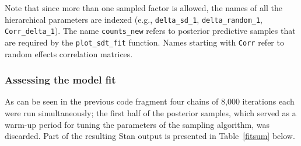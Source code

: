 \documentclass[a4paper,man,apacite,floatsintext]{apa6}
\newcommand{\code}[1]{\texttt{#1}}
\begin{document}
Note that since more than one sampled factor is allowed, the names of
all the hierarchical parameters are indexed (e.g.,
\code{delta\_sd\_1}, \code{delta\_random\_1},
\code{Corr\_delta\_1}). The name \code{counts\_new} refers to
posterior predictive samples that are required by the
\code{plot\_sdt\_fit} function. Names starting with \code{Corr} refer
to random effects correlation matrices.

\subsubsection{Assessing the model fit}

As can be seen in the previous code fragment four chains of 8,000
iterations each were run simultaneously; the first half of the
posterior samples, which served as a warm-up period for tuning the
parameters of the sampling algorithm, was discarded. Part of the
resulting Stan output is presented in Table~\ref{fitsum} below.
\end{document}
